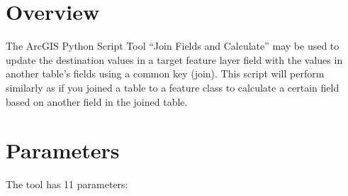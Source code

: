 \documentclass[openany]{book}
\theoremstyle{definition}
\theoremstyle{definition}
\theoremstyle{definition}
\theoremstyle{remark}
\begin{document}
\section{Overview}\label{overview-2}

The ArcGIS Python Script Tool ``Join Fields and Calculate'' may be used
to update the destination values in a target feature layer field with
the values in another table's fields using a common key (join). This
script will perform similarly as if you joined a table to a feature
class to calculate a certain field based on another field in the joined
table.

\section{Parameters}\label{parameters-2}

The tool has 11 parameters:
\end{document}
